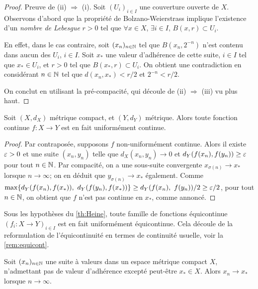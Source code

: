 \begin{proof}
	Preuve de (ii) $\Rightarrow$ (i). 
	Soit $(U_i)_{i \in I}$ une couverture ouverte de $X$. Observons d'abord que la propriété de Bolzano-Weierstrass implique l'existence d'un \emph{nombre de Lebesgue} $r>0$ tel que $\forall x\in X$, $\exists i \in I$, $B(x,r)\subset U_i$. 
	
	En effet, dans le cas contraire, soit $(x_n)_{n \in \mathbb{N}}$ tel que $B(x_n,2^{-n})$ n'est contenu dans aucun des $U_i$, $i \in I$. Soit $x_*$ une valeur d'adhérence de cette suite, $i \in I$ tel que $x_* \in U_i$, et $r>0$ tel que $B(x_*,r) \subset U_i$. On obtient une contradiction en considérant $n\in \mathbb{N}$ tel que $d(x_n,x_*) < r/2$ et $2^{-n} < r/2$.
	
	On conclut en utilisant la pré-compacité, qui découle de (ii) $\Rightarrow$ (iii) vu plus haut. 
\end{proof}

\begin{theorem}[Heine]
\label{th:Heine}
%
Soit $(X,d_X)$ métrique compact, et $(Y,d_Y)$ métrique. Alors toute fonction continue $f : X \to Y$ est en fait uniformément continue. 
\end{theorem}

\begin{proof}
	Par contraposée, supposons $f$ non-uniformément continue. Alors il existe $\varepsilon>0$ et une suite $(x_n,y_n)$ telle que $d_X(x_n,y_n) \to 0$ et $d_Y(f(x_n),f(y_n)) \geq \varepsilon$ pour tout $n \in \mathbb{N}$. Par compacité, on a une sous-suite convergente $x_{\sigma(n)} \to x_*$ lorsque $n \to \infty$; on en déduit que $y_{\sigma(n)} \to x_*$ également.
	Comme $\max \{d_Y(f(x_n),f(x_*)),\ d_Y(f(y_n),f(x_*))\} \geq d_Y(f(x_n),\ f(y_n))/2 \geq \ve/2$, pour tout $n \in \mathbb{N}$, on obtient que $f$ n'est pas continue en $x_*$, comme annoncé.
\end{proof}

Sous les hypothèses du \cref{th:Heine}, toute famille de fonctions équicontinue $(f_i : X \to Y)_{i \in I}$ est en fait uniformément équicontinue. 
Cela découle de la reformulation de l'équicontinuité en termes de continuité usuelle, voir la \cref{rem:equicont}. 	


\begin{proposition}
\label{prop:noAdhCv}
%
	Soit $(x_n)_{n \in \mathbb{N}}$ une suite à valeurs dans un espace métrique compact $X$, n'admettant pas de valeur d'adhérence excepté peut-être $x_*\in X$. Alors $x_n \to x_*$ lorsque $n \to \infty$. 
\end{proposition}

